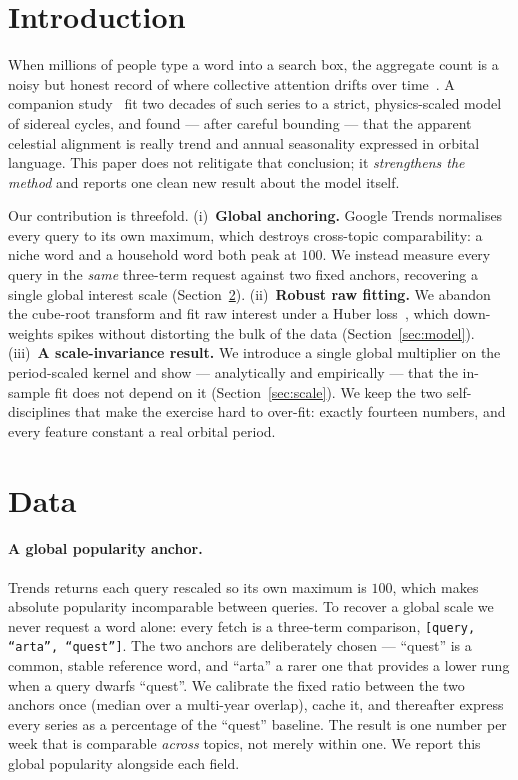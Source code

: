 \documentclass[11pt]{artaquest}
\begin{document}
\section{Introduction}
When millions of people type a word into a search box, the aggregate count is a noisy but honest record
of where collective attention drifts over time~\citep{choi2012predicting}. A companion study~\citep{ashrafnejad2026topics} fit two
decades of such series to a strict, physics-scaled model of sidereal cycles, and found --- after careful
bounding --- that the apparent celestial alignment is really trend and annual seasonality expressed in
orbital language. This paper does not relitigate that conclusion; it \emph{strengthens the method} and
reports one clean new result about the model itself.

Our contribution is threefold. (i)~\textbf{Global anchoring.} Google Trends normalises every query to its
own maximum, which destroys cross-topic comparability: a niche word and a household word both peak at
$100$. We instead measure every query in the \emph{same} three-term request against two fixed anchors,
recovering a single global interest scale (Section~\ref{sec:data}). (ii)~\textbf{Robust raw fitting.} We
abandon the cube-root transform and fit raw interest under a Huber loss~\citep{huber1964robust}, which
down-weights spikes without distorting the bulk of the data (Section~\ref{sec:model}).
(iii)~\textbf{A scale-invariance result.} We introduce a single global multiplier on the period-scaled
kernel and show --- analytically and empirically --- that the in-sample fit does not depend on it
(Section~\ref{sec:scale}). We keep the two self-disciplines that make the exercise hard to over-fit:
exactly fourteen numbers, and every feature constant a real orbital period.

\section{Data}
\label{sec:data}

\paragraph{A global popularity anchor.}
Trends returns each query rescaled so its own maximum is $100$, which makes absolute popularity
incomparable between queries. To recover a global scale we never request a word alone: every fetch is a
three-term comparison, \texttt{[query, ``arta'', ``quest'']}. The two anchors are deliberately chosen ---
``quest'' is a common, stable reference word, and ``arta'' a rarer one that provides a lower rung when a
query dwarfs ``quest''. We calibrate the fixed ratio between the two anchors once (median over a
multi-year overlap), cache it, and thereafter express every series as a percentage of the ``quest''
baseline. The result is one number per week that is comparable \emph{across} topics, not merely within
one. We report this global popularity alongside each field.
\end{document}
